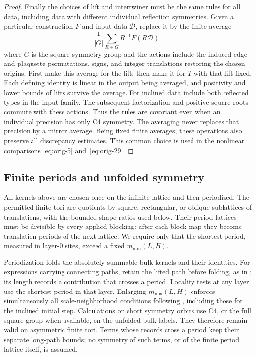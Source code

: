 \begin{proof}
Finally the choices of lift and intertwiner must be the same rules
for all data, including data with different individual reflection
symmetries.  Given a particular construction $F$ and input data
$\mathcal D$, replace it by the finite average
\[
 \frac1{|G|}\sum_{R\in G}R^{-1}F(R\mathcal D),
\]
where $G$ is the square symmetry group and the actions include the
induced edge and plaquette permutations, signs, and integer
translations restoring the chosen origins.  First make this average
for the lift; then make it for $T$ with that lift fixed.
Each defining identity is linear in the output being averaged, and
positivity and lower bounds of lifts survive the average.
For inclined data include both reflected types in the input family.
The subsequent factorization and positive square roots commute with
these actions.  Thus the rules are covariant even when an individual
precision has only C4 symmetry.  The averaging never replaces that
precision by a mirror average.  Being fixed finite averages, these
operations also preserve all discrepancy estimates.  This common
choice is used in the nonlinear comparisons
\eqref{eq:orig-5} and~\eqref{eq:orig-29}.
\end{proof}

\subsection{Finite periods and unfolded symmetry}

All kernels above are chosen once on the infinite lattice and then
periodized.  The permitted finite tori are quotients by square,
rectangular, or oblique sublattices of translations, with the bounded
shape ratios used below.  Their period lattices must be divisible by
every applied blocking: after each block map they become translation
periods of the next lattice.  We require only that the shortest period,
measured in layer-$0$ sites, exceed a fixed $m_{\min}(L,H)$.

Periodization folds the absolutely summable bulk kernels and their
identities.  For expressions carrying connecting paths, retain the
lifted path before folding, as in ; its length
records a contribution that crosses a period.  Locality tests at any
layer use the shortest period in that layer.  Enlarging
$m_{\min}(L,H)$ enforces simultaneously all scale-neighborhood
conditions following , including those for the inclined
initial step.  Calculations on short symmetry orbits use C4, or the
full square group when available, on the unfolded bulk labels.
They therefore remain valid on asymmetric finite tori.  Terms whose
records cross a period keep their separate long-path bounds; no
symmetry of such terms, or of the finite period lattice itself, is
assumed.
